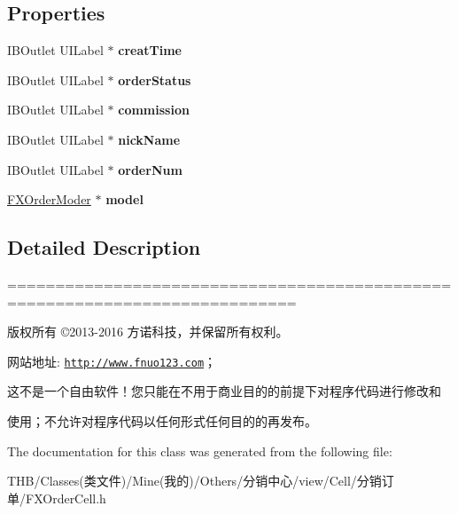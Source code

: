 \subsection*{Properties}
\begin{DoxyCompactItemize}
\item 
\mbox{\label{interface_f_x_order_cell_a8ef3b2fc71205b43e1a52fa0c25fa279}} 
I\+B\+Outlet U\+I\+Label $\ast$ {\bfseries creat\+Time}
\item 
\mbox{\label{interface_f_x_order_cell_abcdf6e3ae5779a4f8a1bbd3a3ba4e38f}} 
I\+B\+Outlet U\+I\+Label $\ast$ {\bfseries order\+Status}
\item 
\mbox{\label{interface_f_x_order_cell_ac8f52e995ebef593e9e8fb70a828549a}} 
I\+B\+Outlet U\+I\+Label $\ast$ {\bfseries commission}
\item 
\mbox{\label{interface_f_x_order_cell_a342e68a148dc9d086363ef9ac8f96a28}} 
I\+B\+Outlet U\+I\+Label $\ast$ {\bfseries nick\+Name}
\item 
\mbox{\label{interface_f_x_order_cell_a74530a2f0cb0e609e1841e65dc168202}} 
I\+B\+Outlet U\+I\+Label $\ast$ {\bfseries order\+Num}
\item 
\mbox{\label{interface_f_x_order_cell_a0bfaeb1fa4c73b7ae5fe694a434dcfa4}} 
\mbox{\hyperlink{interface_f_x_order_moder}{F\+X\+Order\+Moder}} $\ast$ {\bfseries model}
\end{DoxyCompactItemize}


\subsection{Detailed Description}
============================================================================

版权所有 ©2013-\/2016 方诺科技，并保留所有权利。

网站地址\+: \href{http://www.fnuo123.com}{\tt http\+://www.\+fnuo123.\+com}； 



这不是一个自由软件！您只能在不用于商业目的的前提下对程序代码进行修改和

使用；不允许对程序代码以任何形式任何目的的再发布。 

 

The documentation for this class was generated from the following file\+:\begin{DoxyCompactItemize}
\item 
T\+H\+B/\+Classes(类文件)/\+Mine(我的)/\+Others/分销中心/view/\+Cell/分销订单/F\+X\+Order\+Cell.\+h\end{DoxyCompactItemize}
